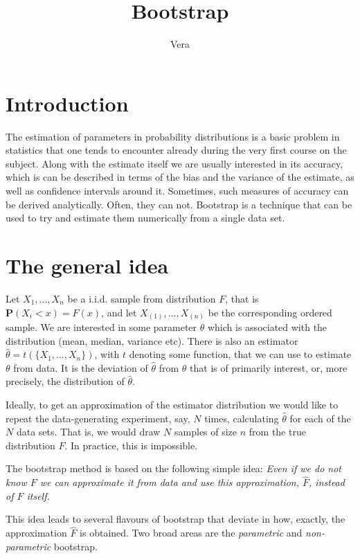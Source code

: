 \documentclass[12pt]{article}
\begin{document}
\title{Bootstrap}
\author{Vera}
\date{}
\maketitle

\section{Introduction}

The estimation of parameters in probability distributions is a basic problem in statistics that one tends to encounter already during the very first course on the subject. Along with the estimate itself we are usually interested in its accuracy, which is can be described in terms of the bias and the variance of the estimate, as well as confidence intervals around it. Sometimes, such measures of accuracy can be derived analytically. Often, they can not. Bootstrap is a technique that can be used to try and estimate them numerically from a single data set. 

\section{The general idea}

Let $X_1,...,X_n$ be a i.i.d. sample from distribution $F$, that is $\mathbf{P}(X_i < x) = F(x)$, and let $X_{(1)},...,X_{(n)}$ be the corresponding ordered sample. We are interested in some parameter $\theta$ which is associated with the distribution (mean, median, variance etc). There is also an estimator $\hat{\theta} = t(\{X_1,...,X_n\})$, with $t$ denoting some function, that we can use to estimate $\theta$ from data. It is the deviation of $\hat{\theta}$ from $\theta$ that is of primarily interest, or, more precisely, the distribution of $\hat{\theta}$.


Ideally, to get an approximation of the estimator distribution we would like to repeat the data-generating experiment, say, $N$ times, calculating $\hat{\theta}$ for each of the $N$ data sets. That is, we would draw $N$ samples of size $n$ from the true distribution $F$. In practice, this is impossible.  

The bootstrap method is based on the following simple idea: \textit{Even if we do not know $F$ we can approximate it from data and use this approximation, $\hat{F}$, instead of $F$ itself.} 

This idea leads to several flavours of bootstrap that deviate in how, exactly, the approximation $\hat{F}$ is obtained. Two broad areas are the \textit{parametric} and \textit{non-parametric} bootstrap.
\end{document}
